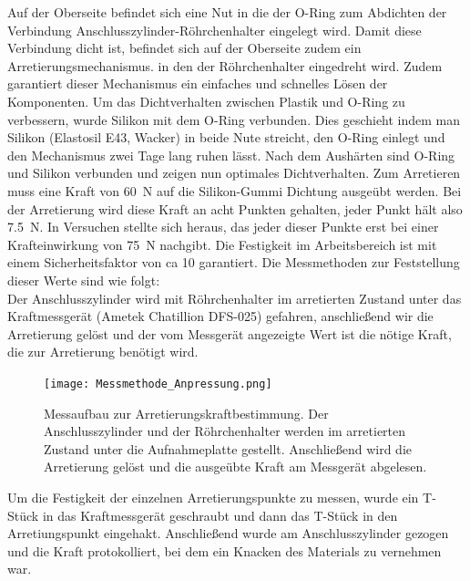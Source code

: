 Auf der Oberseite befindet sich eine Nut in die der O-Ring zum Abdichten der Verbindung Anschlusszylinder-Röhrchenhalter eingelegt wird. Damit diese Verbindung dicht ist, befindet sich auf der Oberseite zudem ein Arretierungsmechanismus. in den der Röhrchenhalter eingedreht wird. Zudem garantiert dieser Mechanismus ein einfaches und schnelles Lösen der Komponenten. Um das Dichtverhalten zwischen Plastik und O-Ring zu verbessern, wurde Silikon mit dem O-Ring verbunden. Dies geschieht indem man Silikon (Elastosil E43, Wacker) in beide Nute streicht, den O-Ring einlegt und den Mechanismus zwei Tage lang ruhen lässt. Nach dem Aushärten sind O-Ring und Silikon verbunden und zeigen nun optimales Dichtverhalten. 
Zum Arretieren muss eine Kraft von \SI{60}{N} auf die Silikon-Gummi Dichtung ausgeübt werden. Bei der Arretierung wird diese Kraft an acht Punkten gehalten, jeder Punkt hält also \SI{7,5}{N}. In Versuchen stellte sich heraus, das jeder dieser Punkte erst bei einer Krafteinwirkung von \SI{75}{N} nachgibt. Die Festigkeit im Arbeitsbereich ist mit einem Sicherheitsfaktor von ca 10 garantiert. Die Messmethoden zur Feststellung dieser Werte sind wie folgt: \hfill \\
Der Anschlusszylinder wird mit Röhrchenhalter im arretierten Zustand unter das Kraftmessgerät (Ametek Chatillion DFS-025) gefahren, anschließend wir die Arretierung gelöst und der vom Messgerät angezeigte Wert ist die nötige Kraft, die zur Arretierung benötigt wird. 

\begin{figure}[h!]
	\begin{center}
		\texttt{[image: Messmethode\_Anpressung.png]}
		\caption[Messaufbau Arretierung 1]{Messaufbau zur Arretierungskraftbestimmung. Der Anschlusszylinder und der Röhrchenhalter werden im arretierten Zustand unter die Aufnahmeplatte gestellt. Anschließend wird die Arretierung gelöst und die ausgeübte Kraft am Messgerät abgelesen.}
	\end{center}
\end{figure}

Um die Festigkeit der einzelnen Arretierungspunkte zu messen, wurde ein T-Stück in das Kraftmessgerät geschraubt und dann das T-Stück in den Arretiungspunkt eingehakt. Anschließend wurde am Anschlusszylinder gezogen und die Kraft protokolliert, bei dem ein Knacken des Materials zu vernehmen war.

